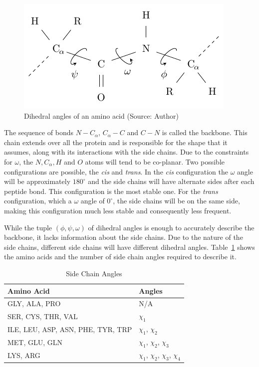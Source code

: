 \begin{figure}
    \centering
    \includegraphics[width=0.7\linewidth]{Figuras/angles.pdf}
    \caption{Dihedral angles of an amino acid (Source: Author)}
    \label{fig:angles}
\end{figure}

The sequence of bonds $N - C_\alpha$, $C_\alpha - C$ and $C - N$ is called the
backbone. This chain extends over all the protein and is responsible for the
shape that it assumes, along with its interactions with the side chains. Due to
the constraints for $\omega$, the $N, C_\alpha, H$ and $O$ atoms will tend to
be co-planar. Two possible configurations are possible, the \textit{cis} and
\textit{trans}. In the \textit{cis} configuration the $\omega$ angle will be
approximately $180^\circ$ and the side chains will have alternate sides after
each peptide bond. This configuration is the most stable one. For the
\textit{trans} configuration, which a $\omega$ angle of $0^\circ$, the side
chains will be on the same side, making this configuration much less stable and
consequently less frequent.

While the tuple $(\phi, \psi, \omega)$ of dihedral angles is enough to
accurately describe the backbone, it lacks information about the side chains.
Due to the nature of the side chains, different side chains will have different
dihedral angles. Table~\ref{tab:side-chain-angles} shows the amino acids and
the number of side chain angles required to describe it.

\begin{table}[]
    \centering
    \begin{tabular}{l|l} \hline \hline
        Amino Acid & Angles \\ \hline \hline
        GLY, ALA, PRO & N/A \\
        SER, CYS, THR, VAL & $\chi_1$ \\
        ILE, LEU, ASP, ASN, PHE, TYR, TRP & $\chi_1$, $\chi_2$ \\
        MET, GLU, GLN & $\chi_1$, $\chi_2$, $\chi_3$ \\
        LYS, ARG & $\chi_1$, $\chi_2$, $\chi_3$, $\chi_4$ \\
        \hline \hline
    \end{tabular}
    \caption{Side Chain Angles}
    \label{tab:side-chain-angles}
\end{table}

